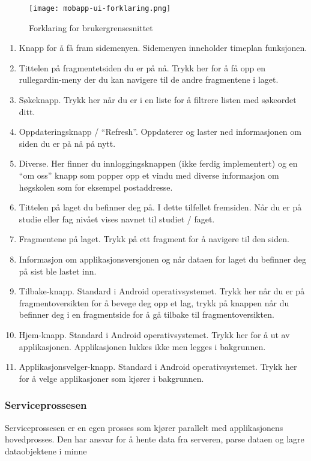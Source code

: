 \documentclass[../main.tex]{subfiles}
\begin{document}
\begin{figure}[H]
  \centering
  \texttt{[image: mobapp-ui-forklaring.png]}
  \caption{Forklaring for brukergrensesnittet}
\end{figure}

\begin{enumerate}
\item Knapp for å få fram sidemenyen. Sidemenyen inneholder timeplan funksjonen.
\item Tittelen på fragmentetsiden du er på nå. Trykk her for å få opp en rullegardin-meny der du kan navigere til de andre fragmentene i laget.
\item Søkeknapp. Trykk her når du er i en liste for å filtrere listen med søkeordet ditt.
\item Oppdateringsknapp / “Refresh”. Oppdaterer og laster ned informasjonen om siden du er på nå på nytt.
\item Diverse. Her finner du innloggingsknappen (ikke ferdig implementert) og en “om oss” knapp som popper opp et vindu med diverse informasjon om høgskolen som for eksempel postaddresse.
\item Tittelen på laget du befinner deg på. I dette tilfellet fremsiden. Når du er på studie eller fag nivået vises navnet til studiet / faget.
\item Fragmentene på laget. Trykk på ett fragment for å navigere til den siden.
\item Informasjon om applikasjonsversjonen og når dataen for laget du befinner deg på sist ble lastet inn.
\item Tilbake-knapp. Standard i Android operativsystemet. Trykk her når du er på fragmentoversikten for å bevege deg opp et lag, trykk på knappen når du befinner deg i en fragmentside for å gå tilbake til fragmentoversikten.
\item Hjem-knapp. Standard i Android operativsystemet. Trykk her for å ut av applikasjonen. Applikasjonen lukkes ikke men legges i bakgrunnen.
\item Applikasjonsvelger-knapp. Standard i Android operativsystemet. Trykk her for å velge applikasjoner som kjører i bakgrunnen.
\end{enumerate}

\subsubsection{Serviceprossesen}

Serviceprossesen er en egen prosses som kjører parallelt med applikasjonens hovedprosses. Den har ansvar for å hente data fra serveren, parse dataen og lagre dataobjektene i minne
\end{document}
